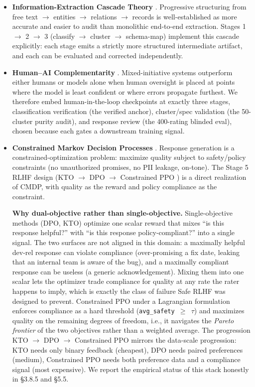 \documentclass[sigconf, nonacm, anonymous, balance=false]{acmart}
\begin{document}
\begin{itemize}
\item
  \textbf{Information-Extraction Cascade Theory} \cite{hearst1999, sarawagi2008}. Progressive structuring from free text $\rightarrow$ entities $\rightarrow$ relations $\rightarrow$ records is well-established as more accurate and easier to audit than monolithic end-to-end extraction. Stages 1 $\rightarrow$ 2 $\rightarrow$ 3 (classify $\rightarrow$ cluster $\rightarrow$ schema-map) implement this cascade explicitly: each stage emits a strictly more structured intermediate artifact, and each can be evaluated and corrected independently.
\item
  \textbf{Human--AI Complementarity} \cite{kamar2016, bansal2019}. Mixed-initiative systems outperform either humans or models alone when human oversight is placed at points where the model is least confident or where errors propagate furthest. We therefore embed human-in-the-loop checkpoints at exactly three stages, classification verification (the verified anchor), cluster/spec validation (the 50-cluster purity audit), and response review (the 400-rating blinded eval), chosen because each gates a downstream training signal.
\item
  \textbf{Constrained Markov Decision Processes} \cite{altman1999, dai2023}. Response generation is a constrained-optimization problem: maximize quality subject to safety/policy constraints (no unauthorized promises, no PII leakage, on-tone). The Stage 5 RLHF design (KTO \cite{ethayarajh2024} $\rightarrow$ DPO \cite{rafailov2023} $\rightarrow$ Constrained PPO \cite{dai2023}) is a direct realization of CMDP, with quality as the reward and policy compliance as the constraint.

  \textbf{Why dual-objective rather than single-objective.} Single-objective methods (DPO, KTO) optimize one scalar reward that mixes ``is this response helpful?'' with ``is this response policy-compliant?'' into a single signal. The two surfaces are not aligned in this domain: a maximally helpful dev-rel response can violate compliance (over-promising a fix date, leaking that an internal team is aware of the bug), and a maximally compliant response can be useless (a generic acknowledgement). Mixing them into one scalar lets the optimizer trade compliance for quality at any rate the rater happens to imply, which is exactly the class of failure Safe RLHF \cite{dai2023} was designed to prevent. Constrained PPO under a Lagrangian formulation enforces compliance as a hard threshold (\texttt{avg\_safety\ $\geq$\ $\tau$}) and maximizes quality on the remaining degrees of freedom, i.e., it navigates the \emph{Pareto frontier} of the two objectives rather than a weighted average. The progression KTO $\rightarrow$ DPO $\rightarrow$ Constrained PPO mirrors the data-scale progression: KTO needs only binary feedback (cheapest), DPO needs paired preferences (medium), Constrained PPO needs both preference data and a compliance signal (most expensive). We report the empirical status of this stack honestly in \S3.8.5 and \S5.5.
\end{itemize}
\end{document}
